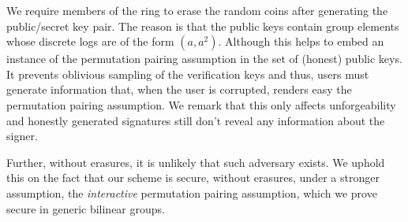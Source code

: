 

We require members of the ring to erase the random coins after generating the public/secret key pair. The reason is that the public keys contain group elements whose discrete logs are of the form $(a,a^2)$. Although this helps to embed an instance of the permutation pairing assumption in the set of (honest) public keys. It prevents oblivious sampling of the verification keys and thus, users must generate information that, when the user is corrupted, renders easy the permutation pairing assumption. We remark that this only affects unforgeability and honestly generated signatures still don't reveal any information about the signer.

Further, without erasures, it is unlikely that such adversary exists. We uphold this on the fact that our scheme is secure, without erasures, under a stronger assumption, the \emph{interactive} permutation pairing assumption, which we prove secure in generic bilinear groups.
%
